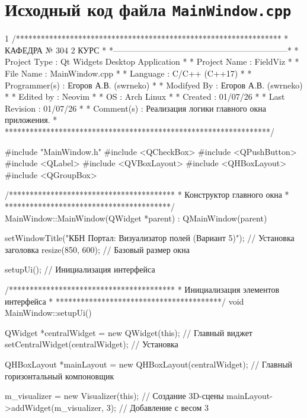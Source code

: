 \section{Исходный код файла \texttt{MainWindow.cpp}}
\footnotesize
\begin{listing}{1}
/****************************************************************
*                     КАФЕДРА № 304 2 КУРС                       *
*---------------------------------------------------------------*
* Project Type  : Qt Widgets Desktop Application                *
* Project Name  : FieldViz                                      *
* File Name     : MainWindow.cpp                                 *
* Language      : C/C++ (C++17)                                  *
* Programmer(s) : Егоров А.В. (swrneko)                          *
* Modifyed By   : Егоров А.В. (swrneko)                          *
* Edited by     : Neovim                                         *
* OS            : Arch Linux                                     *
* Created       : 01/07/26                                       *
* Last Revision : 01/07/26                                       *
* Comment(s)    : Реализация логики главного окна приложения.    *
****************************************************************/

#include "MainWindow.h"
#include <QCheckBox>
#include <QPushButton>
#include <QLabel>
#include <QVBoxLayout>
#include <QHBoxLayout>
#include <QGroupBox>

/****************************************
* Конструктор главного окна             *
****************************************/
MainWindow::MainWindow(QWidget *parent) : QMainWindow(parent) {
  setWindowTitle("КБН Портал: Визуализатор полей (Вариант 5)"); // Установка заголовка
  resize(850, 600); // Базовый размер окна

  setupUi(); // Инициализация интерфейса
}

/****************************************
* Инициализация элементов интерфейса    *
****************************************/
void MainWindow::setupUi() {
  QWidget *centralWidget = new QWidget(this); // Главный виджет
  setCentralWidget(centralWidget); // Установка

  QHBoxLayout *mainLayout = new QHBoxLayout(centralWidget); // Главный горизонтальный компоновщик

  m_visualizer = new Visualizer(this); // Создание 3D-сцены
  mainLayout->addWidget(m_visualizer, 3); // Добавление с весом 3

}
\end{listing}
